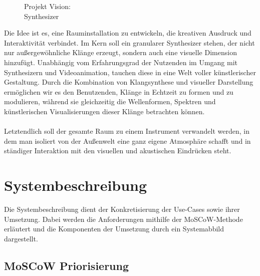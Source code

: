 \documentclass[12pt]{scrartcl}%
\theoremstyle{nonumberplain}
\begin{document}
\begin{figure}[h]
\begin{minipage}[b]{.4\linewidth}
      \caption{Projekt Vision:\\Synthesizer}
   \end{minipage}
\end{figure}
\noindent Die Idee ist es, eine Rauminstallation zu entwickeln, die kreativen Ausdruck und Interaktivität verbindet. Im Kern soll ein granularer Synthesizer stehen, der nicht nur außergewöhnliche Klänge erzeugt, sondern auch eine visuelle Dimension hinzufügt. Unabhängig vom Erfahrungsgrad der Nutzenden im Umgang mit Synthesizern und Videoanimation, tauchen diese in eine Welt voller künstlerischer Gestaltung. Durch die Kombination von Klangsynthese und visueller Darstellung ermöglichen wir es den Benutzenden, Klänge in Echtzeit zu formen und zu modulieren, während sie gleichzeitig die Wellenformen, Spektren und künstlerischen Visualisierungen dieser Klänge betrachten können.\\\\
Letztendlich soll der gesamte Raum zu einem Instrument verwandelt werden, in dem man isoliert von der Außenwelt eine ganz eigene Atmosphäre schafft und in ständiger Interaktion mit den visuellen und akustischen Eindrücken steht.
\newpage
\section{Systembeschreibung}

Die Systembeschreibung dient der Konkretisierung der Use-Cases sowie ihrer Umsetzung. Dabei werden die Anforderungen mithilfe der MoSCoW-Methode erläutert und die Komponenten der Umsetzung durch ein Systemabbild dargestellt.

\subsection{MoSCoW Priorisierung}
\end{document}
